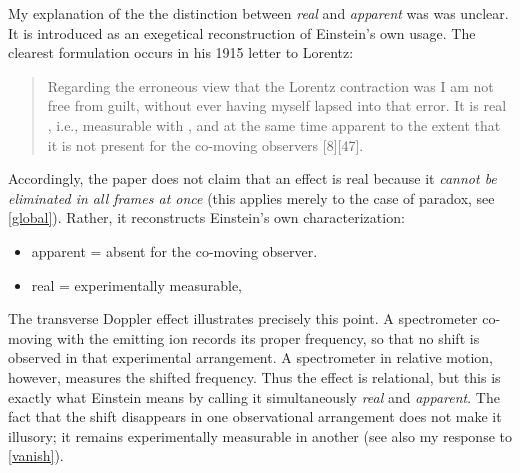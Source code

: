 \documentclass[submitted,11pt]{article}
\begin{document}
\begin{reply}
My explanation of the the distinction between \emph{real} and \emph{apparent} was was unclear. It is introduced as an exegetical reconstruction of Einstein's own usage. The clearest formulation occurs in his 1915 letter to Lorentz:

\begin{quote}
Regarding the erroneous view that the Lorentz contraction was   I am not free from guilt, without ever having myself lapsed into that error. It is real , i.e., measurable with \rac, and at the same time apparent  to the extent that it is not present for the co-moving observers [8][47].
\end{quote}
%
Accordingly, the paper does not claim that an effect is real because it \emph{cannot be eliminated in all frames at once} (this applies merely to the case of \Ehr paradox, see \ref{global}). Rather, it reconstructs Einstein's own characterization: 


\begin{itemize}
\item apparent = absent for the co-moving observer.
\item real = experimentally measurable,
\end{itemize}
%
The transverse Doppler effect illustrates precisely this point. A spectrometer co-moving with the emitting ion records its proper frequency, so that no shift is observed in that experimental arrangement. A spectrometer in relative motion, however, measures the shifted frequency. Thus the effect is relational, but this is exactly what Einstein means by calling it simultaneously \emph{real} and \emph{apparent}. The fact that the shift disappears in one observational arrangement does not make it illusory; it remains experimentally measurable in another (see also my response to \ref{vanish}).

\end{reply}
\end{document}
